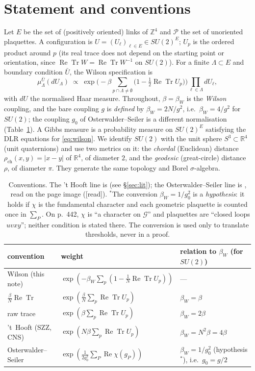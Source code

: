 \documentclass[11pt,a4paper]{article}
\theoremstyle{remark}
\theoremstyle{definition}
\theoremstyle{plain}
\theoremstyle{remark}
\newcommand{\R}{\mathbb{R}}
\newcommand{\Z}{\mathbb{Z}}
\newcommand{\ReTr}{\operatorname{Re}\operatorname{Tr}}
\newcommand{\st}[1]{\textsf{[#1]}}
\newcommand{\rch}{\rho_{\mathrm{ch}}}
\begin{document}
\section{Statement and conventions}\label{sec:statement}

Let $E$ be the set of (positively oriented) links of $\Z^4$ and $\mathcal P$ the set of unoriented plaquettes.
A configuration is $U=(U_\ell)_{\ell\in E}\in SU(2)^E$; $U_p$ is the ordered product around $p$ (its
real trace does not depend on the starting point or orientation, since $\ReTr W=\ReTr W^{-1}$ on $SU(2)$).
For a finite $\Lambda\subset E$ and boundary condition $\bar U$, the Wilson specification is
\begin{equation}\label{eq:wilson}
  \mu^{\bar U}_{\Lambda}(dU_\Lambda)\;\propto\;
  \exp\Big(-\beta\sum_{p\cap\Lambda\neq\emptyset}\big(1-\tfrac12\ReTr U_p\big)\Big)\prod_{\ell\in\Lambda}dU_\ell ,
\end{equation}
with $dU$ the normalised Haar measure. Throughout, $\beta=\beta_W$ is the \emph{Wilson} coupling, and
the bare coupling $g$ is \emph{defined} by $\beta_W=2N/g^2$, i.e.\ $\beta_W=4/g^2$ for $SU(2)$; the coupling
$g_0$ of Osterwalder--Seiler is a different normalisation (Table~\ref{tab:conv}). A Gibbs measure is a probability measure on $SU(2)^E$ satisfying the
DLR equations for \eqref{eq:wilson}.
We identify $SU(2)$ with the unit sphere $S^3\subset\R^4$ (unit quaternions) and use two metrics on it: the
\emph{chordal} (Euclidean) distance $\rch(x,y)=|x-y|$ of $\R^4$, of diameter $2$, and the \emph{geodesic}
(great-circle) distance $\rho$, of diameter $\pi$. They generate the same topology and Borel $\sigma$-algebra.

\begin{table}[htbp]
\centering\small
\begin{tabular}{lll}
\toprule
convention & weight & relation to $\beta_W$ (for $SU(2)$)\\
\midrule
Wilson (this note) & $\exp(-\beta_W\sum_p(1-\frac1N\ReTr U_p))$ & ---\\
$\frac{\beta}{N}\ReTr$ & $\exp(\frac{\beta}{N}\sum_p \ReTr U_p)$ & $\beta_W=\beta$\\
raw trace & $\exp(\beta\sum_p\ReTr U_p)$ & $\beta_W=2\beta$\\
't~Hooft (SZZ, CNS) & $\exp(N\beta\sum_p\ReTr U_p)$ & $\beta_W=N^2\beta=4\beta$\\
Osterwalder--Seiler & $\exp(\frac{1}{2g_0^2}\sum_P \operatorname{Re}\chi(g_P))$ & $\beta_W=1/g_0^2$ (hypothesis${}^\ast$), i.e.\ $g_0=g/2$\\
\bottomrule
\end{tabular}
\caption{Conventions. The 't Hooft line is \cite[(1.2)]{SZZ23} (see \S\ref{sec:lit}); the
Osterwalder--Seiler line is \cite[(2.1)--(2.2), p.~442]{OS78}, read on the page image
(\st{read}). ${}^\ast$The conversion $\beta_W=1/g_0^2$ is a \emph{hypothesis}: it holds if $\chi$ is the
fundamental character and each geometric plaquette is counted once in $\sum_P$. On p.~442, $\chi$ is
``a character on $\mathcal G$'' and plaquettes are ``closed loops $uvxy$''; neither condition is stated
there. The conversion is used only to translate thresholds, never in a proof.}
\label{tab:conv}
\end{table}
\end{document}
